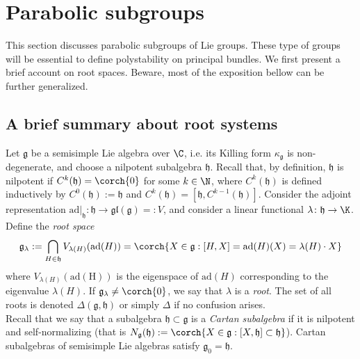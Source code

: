 \section{Parabolic subgroups}
This section discusses parabolic subgroups of Lie groups. These type of groups will be essential to define polystability on principal bundles. We first present a brief account on root spaces. Beware, most of the exposition bellow can be further generalized. 

\subsection{A brief summary about root systems}
Let \(\mathfrak{g}\) be a semisimple Lie algebra over \(\C\), i.e. its Killing form \(\kappa_\mathfrak{g}\) is non-degenerate, and choose a nilpotent subalgebra \(\mathfrak{h}\). Recall that, by definition, \(\mathfrak{h}\) is nilpotent if \(C^k(\mathfrak{h})=\corch{0}\) for some \(k \in \N\), where \(C^k(\mathfrak{h})\) is defined inductively by \(C^0(\mathfrak{h}):=\mathfrak{h}\) and \(C^k(\mathfrak{h})=[\mathfrak{h}, C^{k-1}(\mathfrak{h})]\). Consider the adjoint representation \(\mathrm{ad}|_\mathfrak{h}\colon \mathfrak{h} \to \mathfrak{gl}(\mathfrak{g})=:V\), and consider a linear functional \(\lambda\colon \mathfrak{h} \to \K\). Define the \textit{root space} 
\[
\mathfrak{g}_\lambda:=\bigcap_{H \in \mathfrak{h}} V_{\lambda(H)}(\mathrm{ad}(H))=\corch{X \in \mathfrak{g}: [H,X]=\mathrm{ad}(H)(X)=\lambda(H)\cdot X}
\]
where \(V_{\lambda(H)}(\mathrm{ad(H)})\) is the eigenspace of \(\mathrm{ad}(H)\) corresponding to the eigenvalue \(\lambda(H)\). If \(\mathfrak{g}_\lambda \neq \corch{0}\), we say that \(\lambda\) is a \textit{root}. The set of all roots is denoted \(\Delta(\mathfrak{g}, \mathfrak{h})\) or simply \(\Delta\) if no confusion arises. \\

Recall that we say that a subalgebra \(\mathfrak{h} \subset \mathfrak{g}\) is a \textit{Cartan subalgebra} if it is nilpotent and self-normalizing (that is \(N_\mathfrak{g}(\mathfrak{h}):=\corch{X \in \mathfrak{g}: [X, \mathfrak{h}] \subset \mathfrak{h}}\)). Cartan subalgebras of semisimple Lie algebras satisfy \(\mathfrak{g}_0=\mathfrak{h}\).\\

